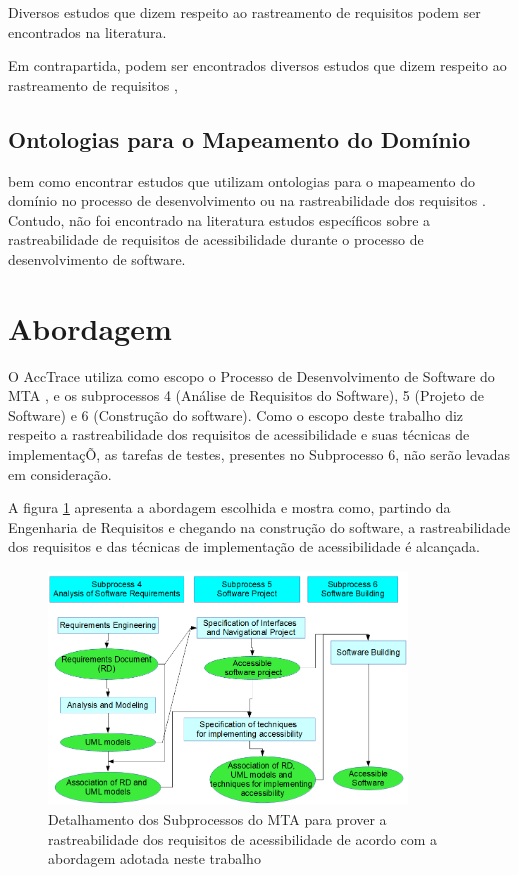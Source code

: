 \documentclass[runningheads,a4paper]{llncs}
\begin{document}
Diversos estudos que dizem respeito ao rastreamento de requisitos podem ser
encontrados na literatura.

 Em contrapartida, podem ser encontrados diversos
estudos que dizem respeito ao rastreamento de requisitos
\cite{5970169,292398,5485417,6405269}, 

\subsection{Ontologias para o Mapeamento do Domínio}

bem como encontrar estudos que utilizam
ontologias para o mapeamento do domínio no processo de desenvolvimento ou na
rastreabilidade dos requisitos \cite{5223183,6511842,4148940,5362244}. Contudo,
não foi encontrado na literatura estudos específicos sobre a rastreabilidade de
requisitos de acessibilidade durante o processo de desenvolvimento de software.

\section{Abordagem}

O AccTrace utiliza como escopo o Processo de Desenvolvimento de Software do MTA
\cite{maia:10}, e os subprocessos 4 (Análise de Requisitos do Software), 5
(Projeto de Software) e 6 (Construção do software). Como o escopo deste trabalho
diz respeito a rastreabilidade dos requisitos de acessibilidade e suas técnicas
de implementaçÕ, as tarefas de testes, presentes no Subprocesso 6, não serão
levadas em consideração.

A figura \ref{fig:figmagica} apresenta a abordagem escolhida e mostra como,
partindo da Engenharia de Requisitos e chegando na construção do software,
a rastreabilidade dos requisitos e das técnicas de implementação de
acessibilidade é alcançada.

\begin{figure}
\centering
\includegraphics[height=6.2cm]{img/figuramagica.png}
\caption{Detalhamento dos Subprocessos do MTA para prover a rastreabilidade dos
requisitos de acessibilidade de acordo com a abordagem adotada neste trabalho}
\label{fig:figmagica}
\end{figure}
\end{document}
